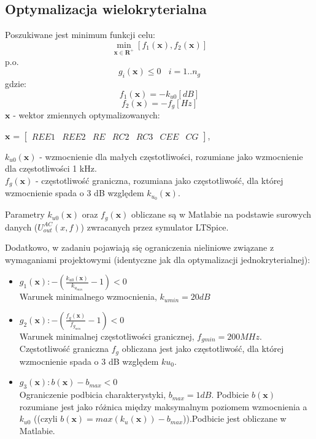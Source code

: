 \documentclass{article}
\begin{document}
\subsection{Optymalizacja wielokryterialna}
Poszukiwane jest minimum funkcji celu:
\[ \min\limits_{\textbf{x}\in \mathbf{R}^+  } [f_1(\textbf{x}), f_2(\textbf{x})] \]
p.o.
\[ g_{i}(\textbf{x}) \leq 0 \ \ \ \  i=1..n_g\]
gdzie:
\[ f_1(\textbf{x}) = -k_{u0} [dB]\] \[ f_2(\textbf{x}) = -f_g [Hz]\]
\(\textbf{x}\) - wektor zmiennych optymalizowanych: \\
\begin{center}
    $\textbf{x}$ =
    $\begin{bmatrix}
            REE1 & REE2 & RE & RC2 & RC3 & CEE & CG
        \end{bmatrix}$,
\end{center}
\(k_{u0}(\textbf{x})\) - wzmocnienie dla małych częstotliwości, rozumiane jako wzmocnienie dla częstotliwości 1 kHz.\\
\(f_{g}(\textbf{x})\) - częstotliwość graniczna, rozumiana jako częstotliwość, dla której wzmocnienie
spada o 3 dB względem $k_{u_{0}}(\textbf{x}) $.

Parametry $k_{u0}(\textbf{x})$ oraz $f_g(\textbf{x})$ obliczane są w Matlabie na podstawie surowych danych ($U^{AC}_{out}(x,f)$) zwracanych
przez symulator LTSpice.

Dodatkowo, w zadaniu pojawiają się ograniczenia nieliniowe związane z wymaganiami projektowymi (identyczne jak dla optymalizacji jednokryterialnej):\\
\begin{itemize}
    \item \(g_1(\textbf{x}): -(\frac{k_{u0}(\textbf{x})}{k_{u_{min}}}-1) <  0\) \\ Warunek minimalnego wzmocnienia, $k_{umin}=20dB$
    \item \(g_2(\textbf{x}): -(\frac{{f_g}(\textbf{x})}{f_{g_{min}}}-1)<0\) \\ Warunek minimalnej częstotliwości granicznej, $f_{gmin}=200 MHz$. Częstotliwość graniczna $f_g$ obliczana jest jako częstotliwość,
          dla której wzmocnienie spada o 3 dB względem $ku_0$.
    \item \(g_3(\textbf{x}): b(\textbf{x})-b_{max}<0\) \\ Ograniczenie podbicia charakterystyki, $b_{max}=1dB$. Podbicie $b(\textbf{x})$ rozumiane jest jako różnica między maksymalnym poziomem wzmocnienia a $k_{u0}$ ((czyli $b(\textbf{x})=max(k_{u}(\textbf{x}))-b_{max}$)).Podbicie jest obliczane w Matlabie.

\end{itemize}
\end{document}
